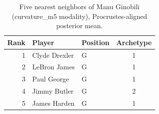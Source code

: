 \begin{table}[htbp]
  \centering\small
  \begin{tabular}{rllc}
    \toprule
    Rank & Player & Position & Archetype \\
    \midrule
    1 & Clyde Drexler & G & 1 \\
    2 & LeBron James & G & 1 \\
    3 & Paul George & G & 1 \\
    4 & Jimmy Butler & G & 2 \\
    5 & James Harden & G & 1 \\
    \bottomrule
  \end{tabular}
  \caption{Five nearest neighbors of Manu Ginobili (curvature_m5 modality), Procrustes-aligned posterior mean.}
  \label{tab:Manu_Ginobili_neighbors_curvature_m5}
\end{table}


